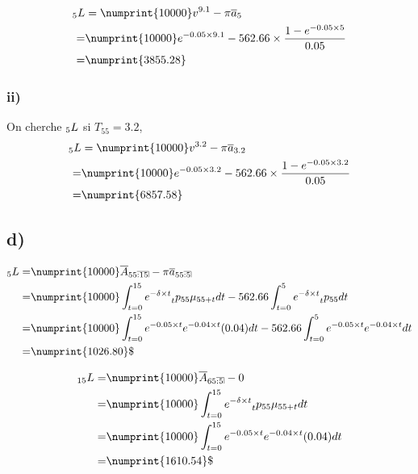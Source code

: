 \documentclass[11pt,french]{report}
\makeatletter
\DeclareRobustCommand{\annuity}[1]{%
\def\arraystretch{0}%
\setlength\arraycolsep{.7pt}%
\setlength\arrayrulewidth{.3pt}%
\begin{array}[b]{@{}c|}\hline
\\[\arraycolsep]%
\scriptstyle #1%
\end{array}%
}
\newcommand{\indiceGauche}[2]{{\vphantom{#2}}_{#1}#2}
\makeatother
\begin{document}
\begin{align*}
\indiceGauche{5}{L} &= \numprint{10000}v^{9.1} - \pi \overline{a}_{5} \\
=& \numprint{10000}e^{-0.05 \times  9.1} - 562.66 \times  \frac{1 - e^{-0.05 \times  5}}{0.05} \\
=& \numprint{3855.28}
\end{align*}

\subsubsection*{ii)}
On cherche $\indiceGauche{5}{L}$ si $T_{55} = 3.2$,
\begin{align*}
\indiceGauche{5}{L} &= \numprint{10000}v^{3.2} - \pi \overline{a}_{3.2} \\
=& \numprint{10000}e^{-0.05 \times  3.2} - 562.66 \times  \frac{1 - e^{-0.05 \times  3.2}}{0.05} \\
=& \numprint{6857.58}
\end{align*}

\subsection*{d)}
\begin{align*}
\indiceGauche{5}{L} =& \numprint{10000} \overline{A}_{55\annuity{:15}} - \pi \overline{a}_{55\annuity{:5}} \\
=& \numprint{10000} \int_{t = 0}^{15}e^{-\delta \times  t}\indiceGauche{t}{p}_{55} \mu_{55 + t} dt - 562.66  \int_{t = 0}^{5}e^{-\delta \times  t}\indiceGauche{t}{p}_{55} dt \\
=& \numprint{10000} \int_{t = 0}^{15}e^{-0.05 \times  t} e^{-0.04 \times  t}(0.04) dt - 562.66  \int_{t = 0}^{5}e^{-0.05 \times  t} e^{-0.04 \times  t} dt \\
=& \numprint{1026.80}\$
\end{align*}

\begin{align*}
\indiceGauche{15}{L} =& \numprint{10000} \overline{A}_{65\annuity{:5}} - 0 \\
=& \numprint{10000} \int_{t = 0}^{15}e^{-\delta \times  t}\indiceGauche{t}{p}_{55} \mu_{55 + t} dt \\
=& \numprint{10000} \int_{t = 0}^{15}e^{-0.05 \times  t} e^{-0.04 \times  t}(0.04) dt\\
=& \numprint{1610.54}\$
\end{align*}
\end{document}
